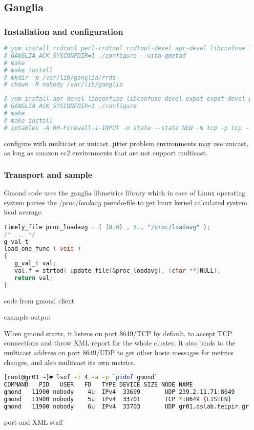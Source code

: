 \newpage

\subsection{Ganglia}

\subsubsection{Installation and configuration}

\begin{lstlisting}[language=bash,caption=Gmetad installation]
# yum install rrdtool perl-rrdtool rrdtool-devel apr-devel libconfuse libconfuse-devel expat expat-devel pcre pcre-devel
# GANGLIA_ACK_SYSCONFDIR=1 ./configure --with-gmetad
# make
# make install
# mkdir -p /var/lib/ganglia/rrds
# chown -R nobody /var/lib/ganglia
\end{lstlisting}

\begin{lstlisting}[language=bash,caption=Gmond installation]
# yum install apr-devel libconfuse libconfuse-devel expat expat-devel pcre pcre-devel
# GANGLIA_ACK_SYSCONFDIR=1 ./configure
# make
# make install
# iptables -A RH-Firewall-1-INPUT -m state --state NEW -m tcp -p tcp --dport 8649 -j ACCEPT
\end{lstlisting}

configure with multicast or unicast. jitter problem environments may use unicast, as long as amazon ec2 environments that are not support multicast.
\newpage

\subsubsection{Transport and sample}
Gmond code uses the ganglia libmetrics library which in case of Linux operating system parses the $/proc/loadavg$ pseudo-file to get linux kernel calculated system load average.

\begin{lstlisting}[language=C,caption=libmetrics code to get load average]
timely_file proc_loadavg = { {0,0} , 5., "/proc/loadavg" };
/* ... */
g_val_t
load_one_func ( void )
{
   g_val_t val;
   val.f = strtod( update_file(&proc_loadavg), (char **)NULL);
   return val;
}
\end{lstlisting}
code from gmond client

example output 

When gmond starts, it listens on port 8649/TCP by default, to accept TCP connections and throw XML report for the whole cluster. It also binds to the multicast address on port 8649/UDP to get other hosts messages for metrics changes, and also multicast its own metrics.
\begin{lstlisting}[language=bash,caption=Gmond networking]
[root@gr01 ~]# lsof -i 4 -a -p `pidof gmond`
COMMAND   PID   USER   FD   TYPE DEVICE SIZE NODE NAME
gmond   11900 nobody    4u  IPv4  33699       UDP 239.2.11.71:8649 
gmond   11900 nobody    5u  IPv4  33701       TCP *:8649 (LISTEN)
gmond   11900 nobody    6u  IPv4  33703       UDP gr01.oslab.teipir.gr:39991->239.2.11.71:8649 
\end{lstlisting}
port and XML staff


